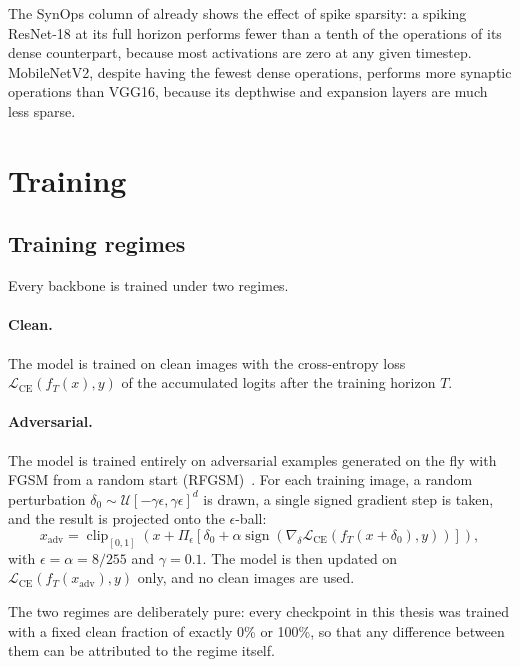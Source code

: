 The SynOps column of  already shows the effect of spike sparsity: a spiking ResNet-18 at its full horizon performs fewer than a tenth of the operations of its dense counterpart, because most activations are zero at any given timestep. MobileNetV2, despite having the fewest dense operations, performs more synaptic operations than VGG16, because its depthwise and expansion layers are much less sparse.

\section{Training}
\label{sec:meth-training}

\subsection{Training regimes}

Every backbone is trained under two regimes.

\paragraph{Clean.} The model is trained on clean images with the cross-entropy loss $\mathcal{L}_{\mathrm{CE}}(f_T(x), y)$ of the accumulated logits after the training horizon $T$.

\paragraph{Adversarial.} The model is trained entirely on adversarial examples generated on the fly with FGSM from a random start (RFGSM)~\cite{tramer2018ensemble, wong2020fast}. For each training image, a random perturbation $\delta_0 \sim \mathcal{U}[-\gamma\epsilon, \gamma\epsilon]^d$ is drawn, a single signed gradient step is taken, and the result is projected onto the $\epsilon$-ball:
\begin{equation}
    x_{\mathrm{adv}} = \operatorname{clip}_{[0,1]}\!\left(x + \Pi_{\epsilon}\!\left[\delta_0 + \alpha \operatorname{sign}\!\left(\nabla_{\delta} \mathcal{L}_{\mathrm{CE}}\left(f_T(x + \delta_0), y\right)\right)\right]\right),
    \label{eq:rfgsm}
\end{equation}
with $\epsilon = \alpha = 8/255$ and $\gamma = 0.1$. The model is then updated on $\mathcal{L}_{\mathrm{CE}}(f_T(x_{\mathrm{adv}}), y)$ only, and no clean images are used.

The two regimes are deliberately pure: every checkpoint in this thesis was trained with a fixed clean fraction of exactly 0\% or 100\%, so that any difference between them can be attributed to the regime itself.

